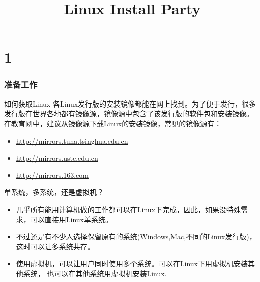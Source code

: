 \documentclass{beamer}
\title{Linux Install Party}
\begin{document}
\begin{frame}
\titlepage
\end{frame}
\begin{frame}
\tableofcontents[part=1]
\end{frame}

\begin{frame}
\tableofcontents[part=2]
\end{frame}

\part{1}
\section{准备工作}
\begin{frame}{如何获取Linux}
各Linux发行版的安装镜像都能在网上找到。为了便于发行，很多发行版在世界各地都有镜像源，镜像源中包含了该发行版的软件包和安装镜像。
在教育网中，建议从镜像源下载Linux的安装镜像，常见的镜像源有：
\begin{itemize}
\item \url{http://mirrors.tuna.tsinghua.edu.cn}
\item \url{http://mirrors.ustc.edu.cn}
\item \url{http://mirrors.163.com}
\end{itemize}
\end{frame}

\begin{frame}{单系统，多系统，还是虚拟机？}
	\begin{itemize}
		\item	几乎所有能用计算机做的工作都可以在Linux下完成，因此，如果没特殊需求，可以直接用Linux单系统。
		\item 不过还是有不少人选择保留原有的系统(Windows,Mac,不同的Linux发行版)，这时可以让多系统共存。
		\item 使用虚拟机，可以让用户同时使用多个系统。可以在Linux下用虚拟机安装其他系统，
			也可以在其他系统用虚拟机安装Linux.
	\end{itemize}
\end{frame}
\end{document}
